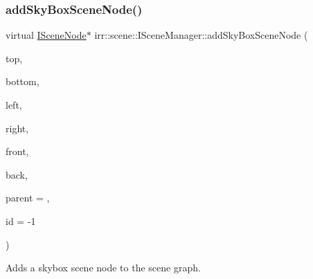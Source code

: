 \subsubsection{\texorpdfstring{add\+Sky\+Box\+Scene\+Node()}{addSkyBoxSceneNode()}}
{\footnotesize\ttfamily virtual \hyperlink{classirr_1_1scene_1_1ISceneNode}{I\+Scene\+Node}$\ast$ irr\+::scene\+::\+I\+Scene\+Manager\+::add\+Sky\+Box\+Scene\+Node (\begin{DoxyParamCaption}\item[{\hyperlink{classirr_1_1video_1_1ITexture}{video\+::\+I\+Texture} $\ast$}]{top,  }\item[{\hyperlink{classirr_1_1video_1_1ITexture}{video\+::\+I\+Texture} $\ast$}]{bottom,  }\item[{\hyperlink{classirr_1_1video_1_1ITexture}{video\+::\+I\+Texture} $\ast$}]{left,  }\item[{\hyperlink{classirr_1_1video_1_1ITexture}{video\+::\+I\+Texture} $\ast$}]{right,  }\item[{\hyperlink{classirr_1_1video_1_1ITexture}{video\+::\+I\+Texture} $\ast$}]{front,  }\item[{\hyperlink{classirr_1_1video_1_1ITexture}{video\+::\+I\+Texture} $\ast$}]{back,  }\item[{\hyperlink{classirr_1_1scene_1_1ISceneNode}{I\+Scene\+Node} $\ast$}]{parent = {},  }\item[{\hyperlink{namespaceirr_ac66849b7a6ed16e30ebede579f9b47c6}{s32}}]{id = {\ttfamily -\/1} }\end{DoxyParamCaption})\hspace{0.3cm}{\ttfamily [pure virtual]}}



Adds a skybox scene node to the scene graph. 

